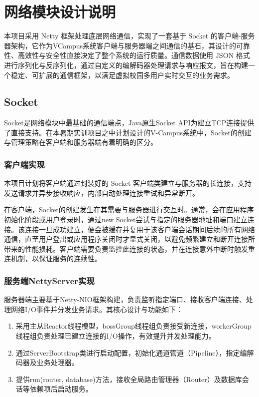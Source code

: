 \ifx\maindoc\undefined
{}
\fi

\section{网络模块设计说明}
本项目采用 Netty 框架处理底层网络通信，实现了一套基于 Socket 的客户端-服务器架构，它作为VCampus系统客户端与服务器端之间通信的基石，其设计的可靠性、高效性与安全性直接决定了整个系统的运行质量。通信数据使用 JSON 格式进行序列化与反序列化，通过自定义的编解码器处理请求与响应报文，旨在构建一个稳定、可扩展的通信框架，以满足虚拟校园多用户实时交互的业务需求。

\subsection{Socket}
Socket是网络模块中最基础的通信端点，Java原生Socket API为建立TCP连接提供了直接支持。在本暑期实训项目之中计划设计的V-Campus系统中，Socket的创建与管理策略在客户端和服务器端有着明确的区分。
\subsubsection{客户端实现}
本项目计划将客户端通过封装好的 Socket 客户端类建立与服务器的长连接，支持发送请求并异步接收响应，内部自动处理连接重试和异常断开。

在客户端，Socket的创建发生在其需要与服务器进行交互时。通常，会在应用程序初始化阶段或用户登录时，通过new Socket尝试与指定的服务器地址和端口建立连接。该连接一旦成功建立，便会被缓存并复用于该客户端会话期间后续的所有网络通信，直至用户登出或应用程序关闭时才显式关闭，以避免频繁建立和断开连接所带来的性能损耗。客户端需要负责监控此连接的状态，并在连接意外中断时触发重连机制，以保证服务的连续性。
\subsubsection{服务端\textbf{NettyServer}实现}
服务器端主要基于Netty-NIO框架构建，负责监听指定端口、接收客户端连接、处理网络I/O事件并分发业务请求。其核心设计与功能如下：
\begin{enumerate}
    \item 采用主从Reactor线程模型，bossGroup线程组负责接受新连接，workerGroup线程组负责处理已建立连接的I/O操作，有效提升并发处理能力。
    \item 通过ServerBootstrap类进行启动配置，初始化通道管道（Pipeline），指定编解码器及业务处理器。
    \item 提供run(router, database)方法，接收全局路由管理器（Router）及数据库会话等依赖项后启动服务。
\end{enumerate}

